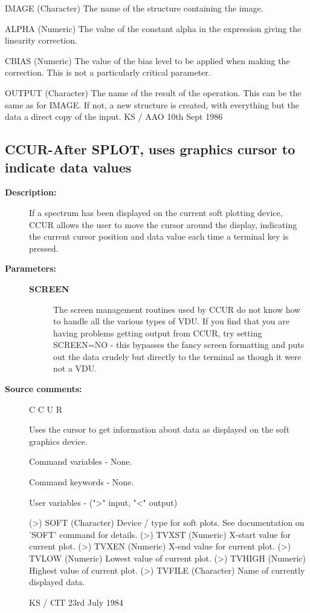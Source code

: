 \begin{description}
\begin{terminalv}
 IMAGE   (Character) The name of the structure containing the image.

 ALPHA   (Numeric) The value of the constant alpha in the expression
         giving the linearity correction.

 CBIAS   (Numeric) The value of the bias level to be applied when
         making the correction.  This is not a particularly critical
         parameter.

 OUTPUT  (Character) The name of the result of the operation.  This
         can be the same as for IMAGE.  If not, a new structure
         is created, with everything but the data a direct
         copy of the input.
                                  KS / AAO 10th Sept 1986
\end{terminalv}
\end{description}
\subsection{CCUR-\label{CCUR}After SPLOT, uses graphics cursor to indicate data values}
\begin{description}

\item [\textbf{Description:}]
 If a spectrum has been displayed on the current soft plotting
 device, CCUR allows the user to move the cursor around the
 display, indicating the current cursor position and data value
 each time a terminal key is pressed.

\item [\textbf{Parameters:}]
\begin{description}
\item [\textbf{SCREEN}]
 The screen management routines used by CCUR do not know
 how to handle all the various types of VDU.  If you
 find that you are having problems getting output from
 CCUR, try setting SCREEN=NO - this bypasses the fancy
 screen formatting and puts out the data crudely but
 directly to the terminal as though it were not a VDU.
\end{description}

\item [\textbf{Source comments:}]
\begin{terminalv}
 C C U R

 Uses the cursor to get information about data as displayed on
 the soft graphics device.

 Command variables - None.

 Command keywords - None.

 User variables -     (">" input, "<" output)

 (>) SOFT     (Character) Device / type for soft plots.
              See documentation on 'SOFT' command for
              details.
 (>) TVXST    (Numeric) X-start value for current plot.
 (>) TVXEN    (Numeric) X-end value for current plot.
 (>) TVLOW    (Numeric) Lowest value of current plot.
 (>) TVHIGH   (Numeric) Highest value of current plot.
 (>) TVFILE   (Character) Name of currently displayed data.

                              KS / CIT 23rd July 1984
\end{terminalv}
\end{description}

